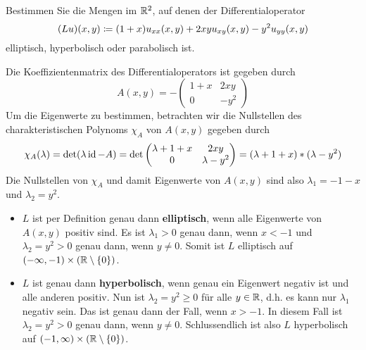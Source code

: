 \begin{exercisePage}
	\setcounter{taskcount}{30}
	
	\begin{task}
		Bestimmen Sie die Mengen im $\mathbb{R}^2$, auf denen der Differentialoperator
		\begin{equation*}
			(Lu)(x,y) \coloneqq (1+x) u_{xx}(x,y) + 2xy u_{xy}(x,y) - y^2 u_{yy}(x,y)
		\end{equation*}
		elliptisch, hyperbolisch oder parabolisch ist.
	\end{task}
	
	
	Die Koeffizientenmatrix des Differentialoperators ist gegeben durch
	\begin{equation*}
		A(x,y) = 
		- \begin{pmatrix}
			1+x & 2xy \\ 0 & -y^2
		\end{pmatrix}
	\end{equation*}
	Um die Eigenwerte zu bestimmen, betrachten wir die Nullstellen des charakteristischen Polynoms $\chi_A$ von $A(x,y)$ gegeben durch
	\begin{equation*}
		\chi_A(\lambda) = \det(\lambda  \operatorname{id} - A) = \det\begin{pmatrix}
		\lambda + 1+x & 2xy \\ 0 & \lambda - y^2
		\end{pmatrix} = (\lambda + 1 + x) * (\lambda - y^2)
	\end{equation*}
	Die Nullstellen von $\chi_A$ und damit Eigenwerte von $A(x,y)$ sind also $\lambda_1 = - 1 - x$ und $\lambda_2 = y^2$.
	
	\begin{itemize}[leftmargin=*]
		\item $L$ ist per Definition genau dann \textbf{elliptisch}, wenn alle Eigenwerte von $A(x,y)$ positiv sind. Es ist $\lambda_1 > 0$ genau dann, wenn $x < -1$ und $\lambda_2 = y^2 > 0$ genau dann, wenn $y \neq 0$. Somit ist $L$ elliptisch auf $(-\infty, -1) \times (\mathbb{R} \setminus \left\{ 0 \right\})$.
		
		\item $L$ ist genau dann \textbf{hyperbolisch}, wenn genau ein Eigenwert negativ ist und alle anderen positiv. Nun ist $\lambda_2 = y^2 \ge 0$ für alle $y \in \mathbb{R}$, d.h. es kann nur $\lambda_1$ negativ sein. Das ist genau dann der Fall, wenn $x > -1$. In diesem Fall ist $\lambda_2 = y^2 > 0$ genau dann, wenn $y \ne 0$. Schlussendlich ist also $L$ hyperbolisch auf $(-1, \infty) \times (\mathbb{R} \setminus \left\{ 0 \right\})$.
		

\end{itemize}
\end{exercisePage}
